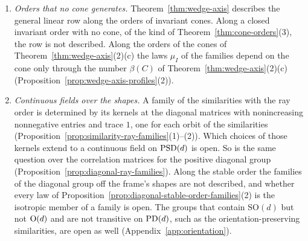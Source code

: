 \begin{enumerate}
\item \emph{Orders that no cone generates.} Theorem~\ref{thm:wedge-axis} describes the general linear
row along the orders of invariant cones. Along a closed invariant order with no cone, of the kind of
Theorem~\ref{thm:cone-orders}(3), the row is not described.
Along the orders of the cones of Theorem~\ref{thm:wedge-axis}(2)(c) the laws $\mu_I$ of the families
depend on the cone only through the number
$\beta(C)$ of Theorem~\ref{thm:wedge-axis}(2)(c) (Proposition~\ref{prop:wedge-axis-profiles}(2)).

\item \emph{Continuous fields over the shapes.}\label{prob:continuous-fields} A family of the similarities with the ray order is
determined by its kernels at the diagonal matrices with nonincreasing nonnegative entries and trace $1$,
one for each orbit of the similarities (Proposition~\ref{prop:similarity-ray-families}(1)--(2)). Which choices of those kernels extend to a
continuous field on $\mathrm{PSD}(d)$ is open. So is the same question over the correlation matrices for the
positive diagonal group (Proposition~\ref{prop:diagonal-ray-families}). Along the stable order the
families of the diagonal group off the frame's shapes are not described, and whether every law of
Proposition~\ref{prop:diagonal-stable-order-families}(2) is the isotropic member of a family is open. The groups that contain
$\mathrm{SO}(d)$ but not $\mathrm{O}(d)$ and are not transitive on $\mathrm{PD}(d)$, such as the
orientation-preserving similarities, are open as well (Appendix~\ref{app:orientation}).


\end{enumerate}
